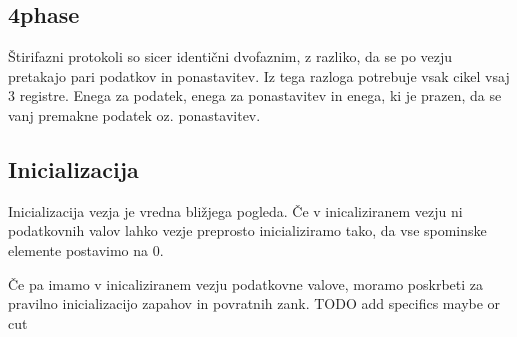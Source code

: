 \subsection{4phase} \label{b}
Štirifazni protokoli so sicer identični dvofaznim, z razliko, da se po vezju pretakajo pari podatkov in ponastavitev. Iz tega razloga potrebuje vsak cikel vsaj 3 registre. Enega za podatek, enega za ponastavitev in enega, ki je prazen, da se vanj premakne podatek oz. ponastavitev.

\subsection{Inicializacija} \label{b}
Inicializacija vezja je vredna bližjega pogleda.
Če v inicaliziranem vezju ni podatkovnih valov lahko vezje preprosto inicializiramo tako, da vse spominske elemente postavimo na 0.

Če pa imamo v inicaliziranem vezju podatkovne valove, moramo poskrbeti za pravilno inicializacijo zapahov in povratnih zank. TODO add specifics maybe or cut


